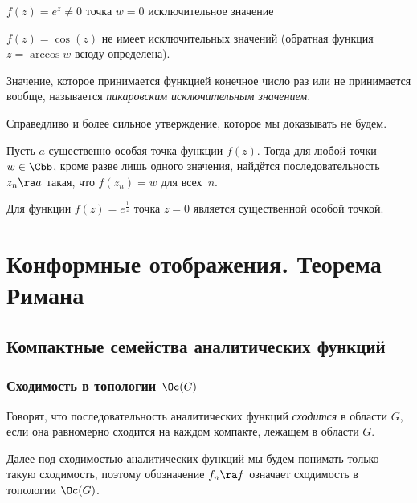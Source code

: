 \documentclass[a4paper]{article}
\begin{document}
\begin{theorem}
\begin{ex}
\begin{nums}{-2}
\item $f(z)=e^z \neq 0$ точка $w=0$ исключительное значение
\item $f(z)=\cos (z)$ не имеет исключительных значений  (обратная функция $z=\arccos w$ всюду определена).
\end{nums}
\end{ex}

\begin{df}
Значение, которое принимается функцией конечное число раз или не принимается вообще,
называется \emph{пикаровским исключительным значением}.
\end{df}

Справедливо и более сильное утверждение, которое мы доказывать не будем.
\begin{theorem}
Пусть $a$ существенно особая точка функции $f(z)$. Тогда для любой точки $w\in \Cbb$,
кроме разве лишь одного значения, найдётся последовательность $z_n \ra a$ такая, что $f(z_n)=w$ для всех~$n$.
\end{theorem}

\begin{ex}
Для функции $f(z)= e^{\frac{1}{z}}$ точка $z=0$ является существенной особой точкой.
\end{ex}

\section{Конформные отображения. Теорема Римана}

\subsection{Компактные семейства аналитических функций}

\subsubsection{Сходимость в топологии $\Oc(G)$}

\begin{df}
Говорят, что последовательность аналитических функций \emph{сходится} в области $G$, если она равномерно сходится
на каждом компакте, лежащем в области $G$.
\end{df}


Далее под сходимостью аналитических функций мы будем понимать только такую сходимость, поэтому
обозначение $f_n\ra f$ означает сходимость в топологии $\Oc(G)$.


\end{theorem}
\end{document}
